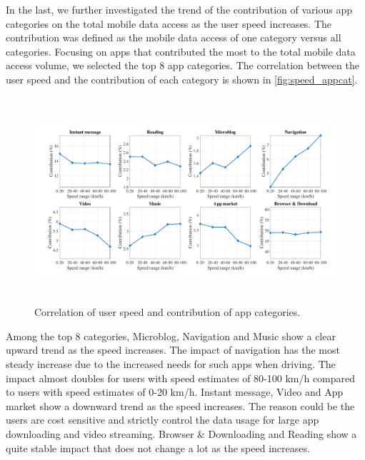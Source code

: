 
In the last, we further investigated the trend of the contribution of various app categories on the total mobile data access as the user speed increases.
The contribution was defined as the mobile data access of one category versus all categories.
Focusing on apps that contributed the most to the total mobile data access volume,
we selected the top 8 app categories.
The correlation between the user speed and the contribution of each category is shown in \autoref{fig:speed_appcat}.


\begin{figure}
    \centering
    \includegraphics[width=\linewidth,height=3in]{./figures/large_font/speed_appcat.pdf}
    \vspace{-0.3in}
    \caption{Correlation of user speed and contribution of app categories.}
    \label{fig:speed_appcat}
\end{figure}

Among the top 8 categories, Microblog, Navigation and Music show a clear upward trend as the speed increases.
The impact of navigation has the most steady increase due to the increased needs for such apps when driving.
The impact almost doubles for users with speed estimates of 80-100 km/h compared to users with speed estimates of 0-20 km/h.
Instant message, Video and App market show a downward trend as the speed increases.
The reason could be the users are cost sensitive and strictly control the data usage for large app downloading and video streaming.
Browser \& Downloading and Reading show a quite stable impact that does not change a lot as the speed increases.








